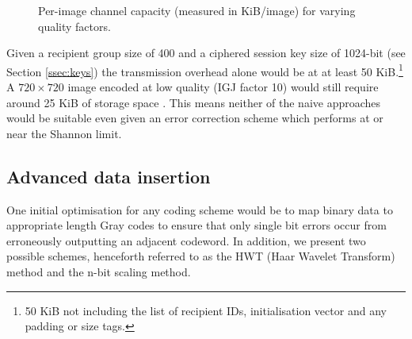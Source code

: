 \begin{figure}[tbph]
  \begin{center}
    \caption{Per-image channel capacity (measured in KiB/image) for varying quality factors.}
    \label{graph:capacity0}
  \end{center}
\end{figure}

Given a recipient group size of 400 and a ciphered session key size of 1024-bit (see Section \ref{ssec:keys}) the transmission overhead alone would be at at least 50 KiB.\footnote{50 KiB not including the list of recipient IDs, initialisation vector and any padding or size tags.} A $720 \times 720$ image encoded at low quality (IGJ factor 10) would still require around 25 KiB of storage space \cite{ijg}. This means neither of the naive approaches would be suitable even given an error correction scheme which performs at or near the Shannon limit. 


\subsection{Advanced data insertion}

One initial optimisation for any coding scheme would be to map binary data to appropriate length Gray codes to ensure that only single bit errors occur from erroneously outputting an adjacent codeword. In addition, we present two possible schemes, henceforth referred to as the HWT (Haar Wavelet Transform) method and the n-bit scaling method.

